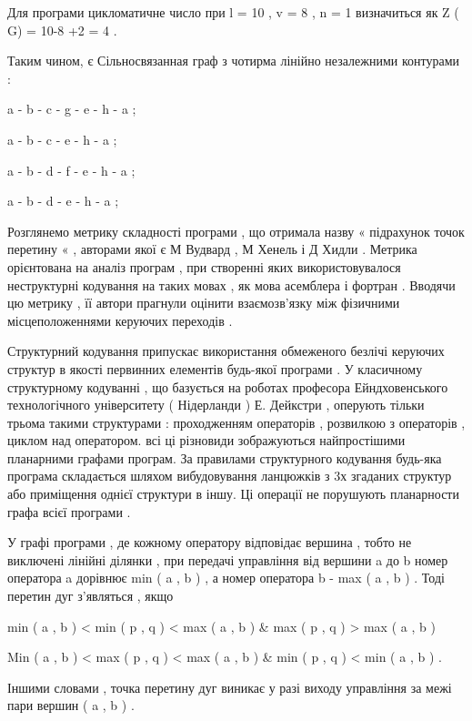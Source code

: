 \documentclass[oneside,final,14pt]{extreport}
\begin{document}
Для програми цикломатичне число при l = 10 , v = 8 , n = 1 визначиться як Z ( G) = 10-8 +2 = 4 .

Таким чином, є Сільносвязанная граф з чотирма лінійно незалежними контурами :

a - b - c - g - e - h - a ;

a - b - c - e - h - a ;

a - b - d - f - e - h - a ;

a - b - d - e - h - a ;

Розглянемо метрику складності програми , що отримала назву « підрахунок точок перетину « , авторами якої є М Вудвард , М Хенель і Д Хидли . Метрика орієнтована на аналіз програм , при створенні яких використовувалося неструктурні кодування на таких мовах , як мова асемблера і фортран . Вводячи цю метрику , її автори прагнули оцінити взаємозв'язку між фізичними місцеположеннями керуючих переходів .

Структурний кодування припускає використання обмеженого безлічі керуючих структур в якості первинних елементів будь-якої програми . У класичному структурному кодуванні , що базується на роботах професора Ейндховенського технологічного університету ( Нідерланди ) Е. Дейкстри , оперують тільки трьома такими структурами : проходженням операторів , розвилкою з операторів , циклом над оператором. всі ці різновиди зображуються найпростішими планарними графами програм. За правилами структурного кодування будь-яка програма складається шляхом вибудовування ланцюжків з 3х згаданих структур або приміщення однієї структури в іншу. Ці операції не порушують планарности графа всієї програми .

У графі програми , де кожному оператору відповідає вершина , тобто не виключені лінійні ділянки , при передачі управління від вершини a до b номер оператора a дорівнює min ( a , b ) , а номер оператора b - max ( a , b ) . Тоді перетин дуг з'являться , якщо

min ( a , b ) \textless{} min ( p , q ) \textless{} max ( a , b ) \& max ( p , q ) \textgreater{} max ( a , b ) \textbar{}

\begin{list}{0em}
\item[] Min ( a , b ) \textless{} max ( p , q ) \textless{} max ( a , b ) \& min ( p , q ) \textless{} min ( a , b ) .
\end{list}

Іншими словами , точка перетину дуг виникає у разі виходу управління за межі пари вершин ( a , b ) .
\end{document}

